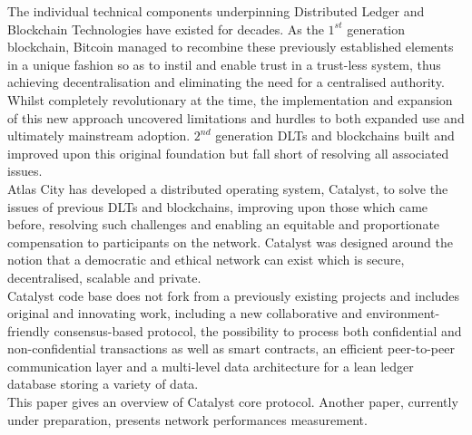 The individual technical components underpinning Distributed Ledger and Blockchain Technologies have existed for decades. As the $1^{st}$ generation blockchain, Bitcoin managed to recombine these previously established elements in a unique fashion so as to instil and enable trust in a trust-less system, thus achieving decentralisation and eliminating the need for a centralised authority. Whilst completely revolutionary at the time, the implementation and expansion of this new approach uncovered limitations and hurdles to both expanded use and ultimately mainstream adoption. $2^{nd}$ generation DLTs and blockchains built and improved upon this original foundation but fall short of resolving all associated issues. \\
 
Atlas City has developed a distributed operating system, Catalyst, to solve the issues of previous DLTs and blockchains, improving upon those which came before, resolving such challenges and enabling an equitable and proportionate compensation to participants on the network. Catalyst was designed around the notion that a democratic and ethical network can exist which is secure, decentralised, scalable and private.  \\
 
Catalyst code base does not fork from a previously existing projects and includes original and innovating work, including a new collaborative and environment-friendly consensus-based protocol, the possibility to process both confidential and non-confidential transactions as well as smart contracts, an efficient peer-to-peer communication layer and a multi-level data architecture for a lean ledger database storing a variety of data.\\
 
This paper gives an overview of Catalyst core protocol. Another paper, currently under preparation, presents network performances measurement. 

